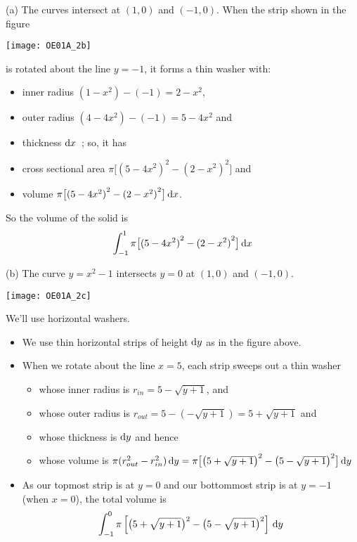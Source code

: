 \begin{solution} (a)
The curves intersect at $(1,0)$ and $(-1,0)$. When the strip shown in the
figure
\begin{center}
       \texttt{[image: OE01A\_2b]}
\end{center}

\noindent
is rotated about the line $y=-1$, it forms a thin washer with:
\begin{itemize}
\item
inner radius  $(1-x^2)-(-1)=2-x^2$,
\item
outer radius $(4-4x^2)-(-1)=5-4x^2$  and
\item thickness $\mathrm{d}x$\ ; so, it has
\item
cross sectional area $\pi\big[{(5-4x^2)}^2-{(2-x^2)}^2\big]$ and
\item
volume $\pi\big[{(5-4x^2)}^2-({2-x^2)}^2\big]\,\mathrm{d}x$.
\end{itemize}

\noindent So the volume of the solid is
\begin{align*}
\int_{-1}^{1}\pi\big[{(5-4x^2)}^2-{(2-x^2)}^2\big]\,\mathrm{d}x
\end{align*}


\noindent (b)
The curve $y=x^2-1$ intersects $y=0$ at $(1,0)$ and $(-1,0)$.

\begin{center}
       \texttt{[image: OE01A\_2c]}
\end{center}

\noindent
We'll use horizontal washers.
 \begin{itemize}
\item We use thin horizontal  strips of height $\mathrm{d}y$ as in the figure  above.

\item
When we rotate about the line $x=5$, each strip sweeps out a thin washer
\begin{itemize}
\item
whose inner radius is $r_{in}=5-\sqrt{y+1}$, and
\item
whose outer radius is $r_{out}= 5-(-\sqrt{y+1})=5+\sqrt{y+1}$ and
\item
whose thickness is $\mathrm{d}y$ and hence
\item
whose volume is
$\pi(r_{out}^2 - r_{in}^2)\,\mathrm{d}y
       = \pi\big[\big(5+\sqrt{y+1}\big)^2-\big(5-\sqrt{y+1}\big)^2\big]\,\mathrm{d}y$

\end{itemize}
\item As our topmost strip is at $y=0$ and our bottommost
strip is at $y=-1$ (when $x=0$), the total volume is
\begin{align*}
\int _{-1}^0   \pi\left[\big(5+\sqrt{y+1}\big)^2-\big(5-\sqrt{y+1}\big)^2\right]\,\mathrm{d}y
\end{align*}
\end{itemize}

\end{solution}


